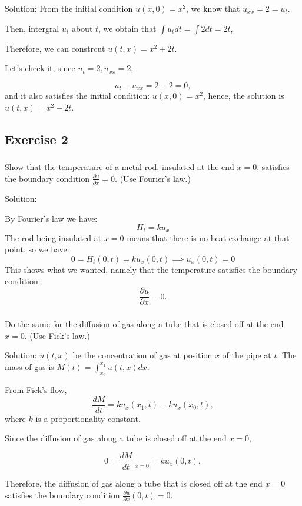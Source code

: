 \documentclass{article}
\begin{document}
		Solution: From the initial condition $u(x,0)=x^2$, we know that $u_{xx}=2=u_t$. 
		
		Then, intergral $u_{t}$ about $t$, we obtain that $\int u_{t} dt= \int 2 dt = 2t$,

		Therefore, we can constrcut $u(t,x)=x^2+2t$.

		Let's check it, since $u_{t}=2, u_{xx}=2$,

		\[u_{t}-u_{xx}=2-2=0,\] and it also satisfies the initial condition: $u(x,0)=x^2$, hence, the solution is $u(t,x)=x^2+2t$.

		\subsection{Exercise 2}
		\subsubsection{}
		Show that the temperature of a metal rod,
			insulated at the end $x=0$, satisfies the boundary
			condition $\frac{\partial u}{\partial x} =0$. (Use
		Fourier's law.)

			Solution:

			By Fourier's law we have:
			\[
				H_t = ku_x
			\]
			The rod being insulated at $x=0$ means that there is no
			heat exchange at that point, so we have:
			\[
				0 = H_t(0,t) = ku_x(0,t) \implies u_x(0,t) =0
			\]
			This shows what we wanted, namely that the temperature
			satisfies the boundary condition:
			\[
				\frac{\partial u}{\partial x} =0.
			\]
		\subsubsection{}
		Do the same for the diffusion of gas along a tube that is closed off at the end $x=0$. (Use Fick's law.)
		
		Solution: $u(t,x)$ be the concentration of gas at position $x$ of the pipe at $t$.
        The mass of gas is $M(t)= \int_{x_0}^{x_1} u(t,x)dx$.
		
		From Fick's flow, 
        \[ \frac{dM}{dt}=ku_{x}(x_{1},t)- ku_{x}(x_{0},t),\]
		where $k$ is a proportionality constant.

		Since the diffusion of gas along a tube is closed off at the end $x=0$,

       \[0= \frac{dM}{dt}|_ {x=0}= ku_{x}(0,t),\]

	   Therefore, the diffusion of gas along a tube that is closed off at the end $x=0$ satisfies the boundary condition $ \frac{\partial u}{\partial x}(0,t)=0.$
\end{document}
